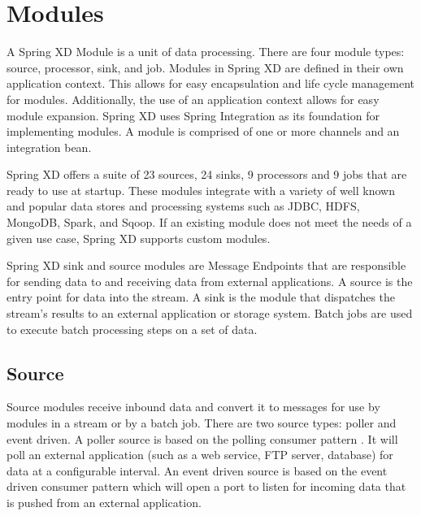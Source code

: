 \section{Modules}
\label{sec:Modules}
A Spring XD Module \cite{modules} is a unit of data processing. There are four module
types: source, processor, sink, and job. Modules in Spring XD are defined
in their own application context. This allows for easy encapsulation and life cycle
management for modules. Additionally, the use of an application context allows for easy
module expansion.  Spring XD uses Spring Integration \cite{spring-integration-reference}
as its foundation for implementing modules. A module is comprised of one or more channels
and an integration bean.

\par

Spring XD offers a suite of 23 sources, 24 sinks, 9 processors and 9 jobs that are ready 
to use at startup.  These modules integrate with a variety of well
known and popular data stores and processing systems such as JDBC, HDFS, MongoDB, Spark,
and Sqoop.  If an existing module does not meet the needs of a given use case, Spring XD
supports custom modules.

Spring XD sink and source modules are Message Endpoints 
\cite{enterprise-integration-pattern-message-endpoint} 
that are responsible for sending data to and receiving data from external applications.
A source is the entry point for data into the stream. A sink is the module that dispatches
the stream's results to an external application or storage system. Batch jobs are used to
execute batch processing steps on a set of data.

\par

\subsection{Source}
Source modules receive inbound data and convert it to messages for
use by modules in a stream or by a batch job.
There are two source types: poller and event driven.  A poller source is based on the polling
consumer pattern \cite{enterprise-integration-pattern-pollingconsumer}. It
will poll an external application (such as a web service, FTP server, database) for data at a
configurable interval. An event driven source is based on the event driven
consumer pattern \cite{enterprise-integration-pattern-eventdrivenconsumer} which will
open a port to listen for incoming data that is pushed from an external application.

